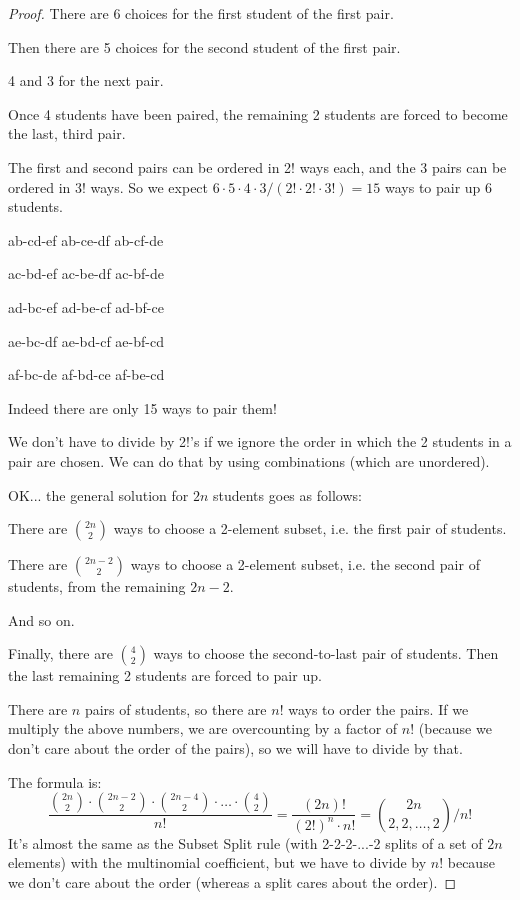 \documentclass[14pt]{extarticle}
\begin{document}
\begin{proof}
There are 6 choices for the first student of the first pair. 

Then there are 5 choices for the second student of the first pair. 

4 and 3 for the next pair. 

Once 4 students have been paired, the remaining 2 students are forced to become the last, third pair. 

The first and second pairs can be ordered in 2! ways each, and the 3 pairs can be ordered in 3! ways. So we expect $6\cdot 5 \cdot 4 \cdot 3 / (2! \cdot 2! \cdot 3!) = 15$ ways to pair up 6 students.

ab-cd-ef ab-ce-df ab-cf-de

ac-bd-ef ac-be-df ac-bf-de

ad-bc-ef ad-be-cf ad-bf-ce

ae-bc-df ae-bd-cf ae-bf-cd

af-bc-de af-bd-ce af-be-cd

Indeed there are only 15 ways to pair them!

We don't have to divide by 2!'s if we ignore the order in which the 2 students in a pair are chosen. We can do that by using combinations (which are unordered).

OK... the general solution for $2n$ students goes as follows:

There are $\binom{2n}{2}$ ways to choose a 2-element subset, i.e. the first pair of students.

There are $\binom{2n-2}{2}$ ways to choose a 2-element subset, i.e. the second pair of students, from the remaining $2n-2$.

And so on.

Finally, there are $\binom{4}{2}$ ways to choose the second-to-last pair of students. Then the last remaining 2 students are forced to pair up.

There are $n$ pairs of students, so there are $n!$ ways to order the pairs. If we multiply the above numbers, we are overcounting by a factor of $n!$ (because we don't care about the order of the pairs), so we will have to divide by that.

The formula is:
$$
\frac{\binom{2n}{2}\cdot\binom{2n-2}{2}\cdot\binom{2n-4}{2}\cdot\ldots\cdot\binom{4}{2}}{n!} = \frac{(2n)!}{(2!)^n\cdot n!} = \binom{2n}{2, 2, \ldots, 2} / n!
$$
It's almost the same as the Subset Split rule (with 2-2-2-...-2 splits of a set of $2n$ elements) with the multinomial coefficient, but we have to divide by $n!$ because we don't care about the order (whereas a split cares about the order).
\end{proof}
\end{document}
